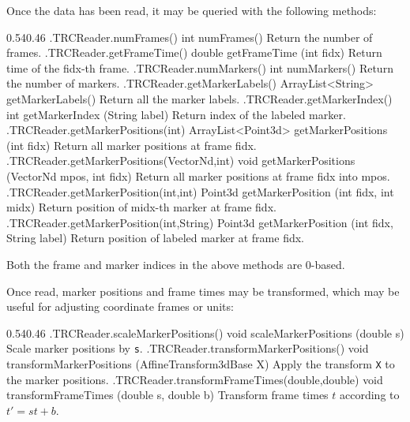 Once the data has been read, it may be queried with the following methods:
%
\begin{methodtable}{0.54}{0.46}
\midline
%
\methodentry
{\probes.TRCReader.numFrames()}%
{int numFrames()}%
{Return the number of frames.}%
%
\methodentry
{\probes.TRCReader.getFrameTime()}%
{double getFrameTime (int fidx)}%
{Return time of the fidx-th frame.}%
%
\methodentry
{\probes.TRCReader.numMarkers()}%
{int numMarkers()}%
{Return the number of markers.}%
%
\methodentry
{\probes.TRCReader.getMarkerLabels()}%
{ArrayList<String> getMarkerLabels()}%
{Return all the marker labels.}%
%
\methodentry
{\probes.TRCReader.getMarkerIndex()}%
{int getMarkerIndex (String label)}%
{Return index of the labeled marker.}%
%
\methodentry
{\probes.TRCReader.getMarkerPositions(int)}%
{ArrayList<Point3d> getMarkerPositions (int fidx)}%
{Return all marker positions at frame fidx.}%
%
\methodentry
{\probes.TRCReader.getMarkerPositions(VectorNd,int)}%
{void getMarkerPositions (VectorNd mpos, int fidx)}%
{Return all marker positions at frame fidx into mpos.}%
%
\methodentry
{\probes.TRCReader.getMarkerPosition(int,int)}%
{Point3d getMarkerPosition (int fidx, int midx)}%
{Return position of midx-th marker at frame fidx.}%
%
\methodentry
{\probes.TRCReader.getMarkerPosition(int,String)}%
{Point3d getMarkerPosition (int fidx, String label)}%
{Return position of labeled marker at frame fidx.}%
%
\midline
\end{methodtable}
%
Both the frame and marker indices in the above methods are 0-based.

Once read, marker positions and frame times may be transformed, which may be
useful for adjusting coordinate frames or units:
%
\begin{methodtable}{0.54}{0.46}
\midline
%
\methodentry
{\probes.TRCReader.scaleMarkerPositions()}%
{void scaleMarkerPositions (double s)}%
{Scale marker positions by {\tt s}.}%
%
\methodentry
{\probes.TRCReader.transformMarkerPositions()}%
{void transformMarkerPositions (AffineTransform3dBase X)}%
{Apply the transform {\tt X} to the marker positions.}%
%
\methodentry
{\probes.TRCReader.transformFrameTimes(double,double)}%
{void transformFrameTimes (double s, double b)}%
{Transform frame times $t$ according to $t' = s t + b$.}%
%
\midline
\end{methodtable}
%

